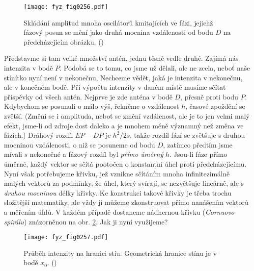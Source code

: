     \begin{figure}[ht!] %
      \centering
      \texttt{[image: fyz\_fig0256.pdf]}
      \caption{Skládání amplitud mnoha oscilátorů kmitajících ve fázi, jejichž fázový posun se mění 
              jako druhá mocnina vzdálenosti od bodu \(D\) na předcházejícím obrázku.
               (\cite[s.~389]{Feynman01})}
      \label{fyz:fig0256}
    \end{figure}
    
    Představme si tam velké množství antén, jednu těsně vedle druhé. Zajímá nás intenzita v bodě 
    \(P\). Podobá se to tomu, co jsme už dělali, ale ne zcela, neboť naše stínítko nyní není v 
    nekonečnu, Nechceme vědět, jaká je intenzita v nekonečnu, ale v konečném bodě. Při výpočtu 
    intenzity v daném místě musíme sčítat příspěvky od všech antén. Nejprve je zde anténa v bodě 
    \(D\), přesně proti bodu \(P\). Kdybychom se posunuli o málo výš, řekněme o vzdálenost \(h\), 
    časové zpoždění se zvětší. (Změní se i amplituda, neboť se změní vzdálenost, ale je to jen 
    velmi malý efekt, jsme-li od zdroje dost daleko a je mnohem méně významný než změna ve fázích.) 
    Dráhový rozdíl \(EP - DP\) je \(h^2/2s\), takže rozdíl fází se zvětšuje s druhou mocninou 
    vzdálenosti, o niž se posuneme od bodu \(D\), zatímco předtím jsme mívali \(s\) nekonečné a 
    fázový rozdíl byl \emph{přímo úměrný} \(h\). Jsou-li fáze přímo úměrné, každý vektor se sčítá 
    pootočen o konstantní úhel proti předcházejícímu. Nyní však potřebujeme křivku, jež vznikne 
    sčítáním mnoha infinitezimálně malých vektorů za podmínky, že úhel, který svírají, se 
    nezvětšuje lineárně, ale s \emph{druhou mocninou} délky křivky. Ke konstrukci takové křivky je 
    třeba trochu složitější matematiky, ale vždy jí můžeme zkonstruovat přímo nanášením vektorů a 
    měřením úhlů. V každém případě dostaneme nádhernou křivku (\emph{Cornuovo spirálu}) znázorněnou 
    na obr. \ref{fyz:fig0257}. Jak ji nyní využijeme?

    \begin{figure}[ht!] %
      \centering
      \texttt{[image: fyz\_fig0257.pdf]}
      \caption{Průběh intenzity na hranici stíu. Geometrická hranice stínu je v bodě \(x_0\).
               (\cite[s.~403]{Feynman01})}
      \label{fyz:fig0257}
    \end{figure}

